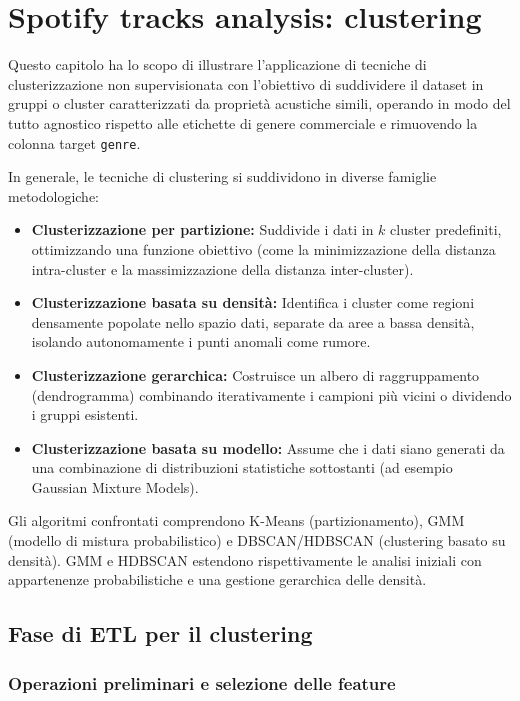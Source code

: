 \section{Spotify tracks analysis: clustering}

Questo capitolo ha lo scopo di illustrare l'applicazione di tecniche di clusterizzazione non supervisionata con l'obiettivo di suddividere il dataset in gruppi o cluster caratterizzati da proprietà acustiche simili, operando in modo del tutto agnostico rispetto alle etichette di genere commerciale e rimuovendo la colonna target \texttt{genre}.

In generale, le tecniche di clustering si suddividono in diverse famiglie metodologiche:
\begin{itemize}
    \item \textbf{Clusterizzazione per partizione:} Suddivide i dati in $k$ cluster predefiniti, ottimizzando una funzione obiettivo (come la minimizzazione della distanza intra-cluster e la massimizzazione della distanza inter-cluster).
    \item \textbf{Clusterizzazione basata su densità:} Identifica i cluster come regioni densamente popolate nello spazio dati, separate da aree a bassa densità, isolando autonomamente i punti anomali come rumore.
    \item \textbf{Clusterizzazione gerarchica:} Costruisce un albero di raggruppamento (dendrogramma) combinando iterativamente i campioni più vicini o dividendo i gruppi esistenti.
    \item \textbf{Clusterizzazione basata su modello:} Assume che i dati siano generati da una combinazione di distribuzioni statistiche sottostanti (ad esempio Gaussian Mixture Models).
\end{itemize}

Gli algoritmi confrontati comprendono K-Means (partizionamento), GMM (modello di mistura probabilistico) e DBSCAN/HDBSCAN (clustering basato su densità). GMM e HDBSCAN estendono rispettivamente le analisi iniziali con appartenenze probabilistiche e una gestione gerarchica delle densità.

\subsection{Fase di ETL per il clustering}

\subsubsection{Operazioni preliminari e selezione delle feature}

